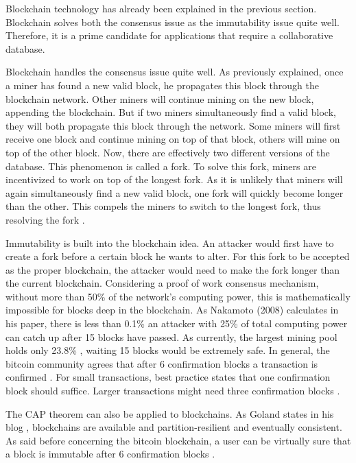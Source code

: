 Blockchain technology has already been explained in the previous section. Blockchain solves both the consensus issue as the immutability issue quite well. Therefore, it is a prime candidate for applications that require a collaborative database.

Blockchain handles the consensus issue quite well. As previously explained, once a miner has found a new valid block, he propagates this block through the blockchain network. Other miners will continue mining on the new block, appending the blockchain. But if two miners simultaneously find a valid block, they will both propagate this block through the network. Some miners will first receive one block and continue mining on top of that block, others will mine on top of the other block. Now, there are effectively two different versions of the database. This phenomenon is called a fork. To solve this fork, miners are incentivized to work on top of the longest fork. As it is unlikely that miners will again simultaneously find a new valid block, one fork will quickly become longer than the other. This compels the miners to switch to the longest fork, thus resolving the fork \cite{antonopoulos:2014}. 


Immutability is built into the blockchain idea. An attacker would first have to create a fork before a certain block he wants to alter. For this fork to be accepted as the proper blockchain, the attacker would need to make the fork longer than the current blockchain. Considering a proof of work consensus mechanism, without more than 50\% of the network's computing power, this is mathematically impossible for blocks deep in the blockchain. As Nakamoto (2008) calculates in his paper, there is less than 0.1\% an attacker with 25\% of total computing power can catch up after 15 blocks have passed. As currently, the largest mining pool holds only 23.8\% \cite{hashrate-distribution}, waiting 15 blocks would be extremely safe. In general, the bitcoin community agrees that after 6 confirmation blocks a transaction is confirmed \cite{bitcoin-confirmation-amount}. For small transactions, best practice states that one confirmation block should suffice. Larger transactions might need three confirmation blocks \cite{confirmation-safety}.


The CAP theorem can also be applied to blockchains. As Goland states in his blog \cite{blockchain-cap}, blockchains are available and partition-resilient and eventually consistent. As said before concerning the bitcoin blockchain, a user can be virtually sure that a block is immutable after 6 confirmation blocks \cite{bitcoin-confirmation-amount}.

